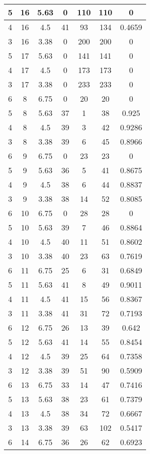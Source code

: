 \documentclass[letterpaper, 12pt]{article}
\begin{document}
\begin{longtable}{|c|c|c|c|c|c|c|}
\hline
5 & 16 & 5.63 & 0 & 110 & 110 & 0 \\
\hline
4 & 16 & 4.5 & 41 & 93 & 134 & 0.4659 \\
\hline
3 & 16 & 3.38 & 0 & 200 & 200 & 0 \\
\hline
5 & 17 & 5.63 & 0 & 141 & 141 & 0 \\
\hline
4 & 17 & 4.5 & 0 & 173 & 173 & 0 \\
\hline
3 & 17 & 3.38 & 0 & 233 & 233 & 0 \\
\hline
6 & 8 & 6.75 & 0 & 20 & 20 & 0 \\
\hline
5 & 8 & 5.63 & 37 & 1 & 38 & 0.925 \\
\hline
4 & 8 & 4.5 & 39 & 3 & 42 & 0.9286 \\
\hline
3 & 8 & 3.38 & 39 & 6 & 45 & 0.8966 \\
\hline
6 & 9 & 6.75 & 0 & 23 & 23 & 0 \\
\hline
5 & 9 & 5.63 & 36 & 5 & 41 & 0.8675 \\
\hline
4 & 9 & 4.5 & 38 & 6 & 44 & 0.8837 \\
\hline
3 & 9 & 3.38 & 38 & 14 & 52 & 0.8085 \\
\hline
6 & 10 & 6.75 & 0 & 28 & 28 & 0 \\
\hline
5 & 10 & 5.63 & 39 & 7 & 46 & 0.8864 \\
\hline
4 & 10 & 4.5 & 40 & 11 & 51 & 0.8602 \\
\hline
3 & 10 & 3.38 & 40 & 23 & 63 & 0.7619 \\
\hline
6 & 11 & 6.75 & 25 & 6 & 31 & 0.6849 \\
\hline
5 & 11 & 5.63 & 41 & 8 & 49 & 0.9011 \\
\hline
4 & 11 & 4.5 & 41 & 15 & 56 & 0.8367 \\
\hline
3 & 11 & 3.38 & 41 & 31 & 72 & 0.7193 \\
\hline
6 & 12 & 6.75 & 26 & 13 & 39 & 0.642 \\
\hline
5 & 12 & 5.63 & 41 & 14 & 55 & 0.8454 \\
\hline
4 & 12 & 4.5 & 39 & 25 & 64 & 0.7358 \\
\hline
3 & 12 & 3.38 & 39 & 51 & 90 & 0.5909 \\
\hline
6 & 13 & 6.75 & 33 & 14 & 47 & 0.7416 \\
\hline
5 & 13 & 5.63 & 38 & 23 & 61 & 0.7379 \\
\hline
4 & 13 & 4.5 & 38 & 34 & 72 & 0.6667 \\
\hline
3 & 13 & 3.38 & 39 & 63 & 102 & 0.5417 \\
\hline
6 & 14 & 6.75 & 36 & 26 & 62 & 0.6923 \\

\end{longtable}
\end{document}

